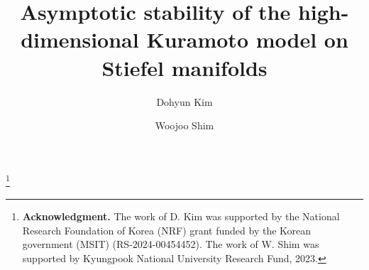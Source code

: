 \documentclass[11pt,reqno]{amsart}
\numberwithin{figure}{section}
\begin{document}
\title[ ]{Asymptotic stability of the high-dimensional Kuramoto model on Stiefel manifolds}

 

\author[D. Kim]{Dohyun Kim}
\address[D. Kim]{\newline Department of Mathematics Education, \newline Sungkyunkwan University, Seoul 03063, Republic of Korea}




\author[W. Shim]{Woojoo Shim}
\address[W. Shim]{\newline Department of Mathematics Education, \newline Kyungpook National University, Republic of Korea}



\thanks{\textbf{Acknowledgment.} The work of D. Kim was supported by the National Research Foundation of Korea (NRF) grant funded by the Korean government (MSIT) (RS-2024-00454452). The work of W. Shim was supported by Kyungpook National University Research Fund, 2023.}








%
%




\end{document}
